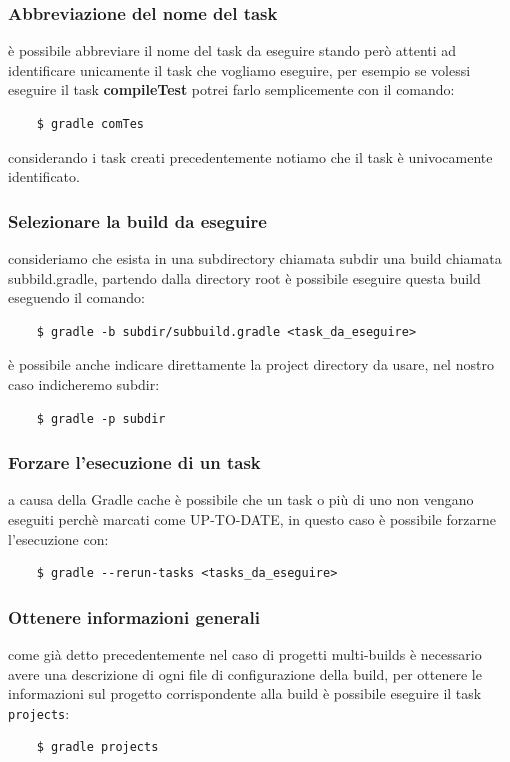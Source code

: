 \documentclass{article}
\begin{document}
\begin{flushleft}
\subsubsection{Abbreviazione del nome del task} è possibile abbreviare il nome del task da eseguire stando però attenti ad identificare unicamente il task che vogliamo eseguire, per esempio se volessi eseguire il task \textbf{compileTest} potrei farlo semplicemente con il comando:
\begin{verbatim}
    $ gradle comTes \end{verbatim}
considerando i task creati precedentemente notiamo che il task è univocamente identificato.

\subsubsection{Selezionare la build da eseguire} consideriamo che esista in una subdirectory chiamata subdir una build chiamata subbild.gradle, partendo dalla directory root è possibile eseguire questa build eseguendo il comando:
\begin{verbatim}
    $ gradle -b subdir/subbuild.gradle <task_da_eseguire> \end{verbatim}
è possibile anche indicare direttamente la project directory da usare, nel nostro caso indicheremo subdir:
\begin{verbatim}
    $ gradle -p subdir  \end{verbatim}

\subsubsection{Forzare l'esecuzione di un task} a causa della Gradle cache è possibile che un task o più di uno non vengano eseguiti perchè marcati come UP-TO-DATE, in questo caso è possibile forzarne l'esecuzione con:
\begin{verbatim}
    $ gradle --rerun-tasks <tasks_da_eseguire> \end{verbatim}

\subsubsection{Ottenere informazioni generali} come già detto precedentemente nel caso di progetti multi-builds è necessario avere una descrizione di ogni file di configurazione della build, per ottenere le informazioni sul progetto corrispondente alla build è possibile eseguire il task \texttt{projects}:
\begin{verbatim}
    $ gradle projects \end{verbatim}


\end{flushleft}
\end{document}
